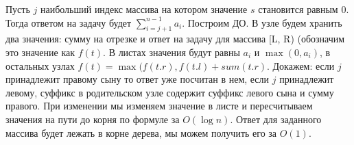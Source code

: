 \documentclass{article}
\begin{document}
\begin{flushleft}
Пусть $j$ наибольший индекс массива на котором значение $s$ становится равным 0. Тогда ответом на задачу будет $\sum\limits_{i = j + 1}^{n - 1}{a_i}$. Построим ДО. В узле будем хранить два значения: сумму на отрезке и ответ на задачу для массива [L, R) (обозначим это значение как $f(t)$. В листах значения будут равны $a_i$ и $\max(0, a_i)$, в остальных узлах $f(t) = \max(f(t.r), f(t.l) + sum(t.r)$. Докажем: если $j$ принадлежит правому сыну то ответ уже посчитан в нем, если $j$ принадлежит левому, суффикс в родительском узле содержит суффикс левого сына и сумму правого. При изменении мы изменяем значение в листе и пересчитываем значения на пути до корня по формуле за $O(\log{n})$. Ответ для заданного массива будет лежать в корне дерева, мы можем получить его за $O(1)$.

\end{flushleft}
\end{document}
